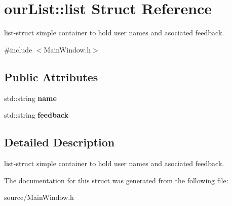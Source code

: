 \section{our\+List\+:\+:list Struct Reference}
\label{structour_list_1_1list}


list-\/struct simple container to hold user names and asociated feedback.  




{\ttfamily \#include $<$Main\+Window.\+h$>$}

\subsection*{Public Attributes}
\begin{DoxyCompactItemize}
\item 
\mbox{\label{structour_list_1_1list_a61958a7b9831a5adb983b92f0bdf5c85}} 
std\+::string {\bfseries name}
\item 
\mbox{\label{structour_list_1_1list_a36fd06e68ed83177eb74b47a35085fcb}} 
std\+::string {\bfseries feedback}
\end{DoxyCompactItemize}


\subsection{Detailed Description}
list-\/struct simple container to hold user names and asociated feedback. 

The documentation for this struct was generated from the following file\+:\begin{DoxyCompactItemize}
\item 
source/Main\+Window.\+h\end{DoxyCompactItemize}

